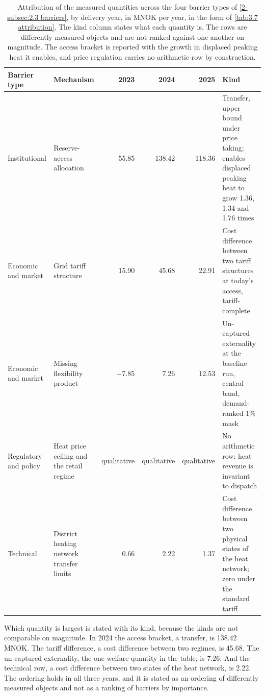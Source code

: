 \begin{table}[htbp]
\centering
\caption{Attribution of the measured quantities across the four barrier types of \autoref{2-subsec:2.3 barriers}, by delivery year, in MNOK per year, in the form of \autoref{tab:3.7 attribution}. The kind column states what each quantity is. The rows are differently measured objects and are not ranked against one another on magnitude. The access bracket is reported with the growth in displaced peaking heat it enables, and price regulation carries no arithmetic row by construction.}
\footnotesize
\begin{tabular}{p{2.3cm} p{2.6cm} r r r p{4.6cm}}
\toprule
\textbf{Barrier type} & \textbf{Mechanism} & \textbf{2023} & \textbf{2024} & \textbf{2025} & \textbf{Kind} \\
\midrule
Institutional & Reserve-access allocation & 55.85 & 138.42 & 118.36 & Transfer, upper bound under price taking; enables displaced peaking heat to grow 1.36, 1.34 and 1.76 times \\
\addlinespace
Economic and market & Grid tariff structure & 15.90 & 45.68 & 22.91 & Cost difference between two tariff structures at today's access, tariff-complete \\
\addlinespace
Economic and market & Missing flexibility product & $-$7.85 & 7.26 & 12.53 & Un-captured externality at the baseline run, central band, demand-ranked $1\%$ mask \\
\addlinespace
Regulatory and policy & Heat price ceiling and the retail regime & qualitative & qualitative & qualitative & No arithmetic row: heat revenue is invariant to dispatch \\
\addlinespace
Technical & District heating network transfer limits & 0.66 & 2.22 & 1.37 & Cost difference between two physical states of the heat network; zero under the standard tariff \\
\bottomrule
\end{tabular}
\label{tab:4.4 attribution}
\end{table}

Which quantity is largest is stated with its kind, because the kinds are not comparable on magnitude. In 2024 the access bracket, a transfer, is 138.42 MNOK. The tariff difference, a cost difference between two regimes, is 45.68. The un-captured externality, the one welfare quantity in the table, is 7.26. And the technical row, a cost difference between two states of the heat network, is 2.22. The ordering holds in all three years, and it is stated as an ordering of differently measured objects and not as a ranking of barriers by importance.

